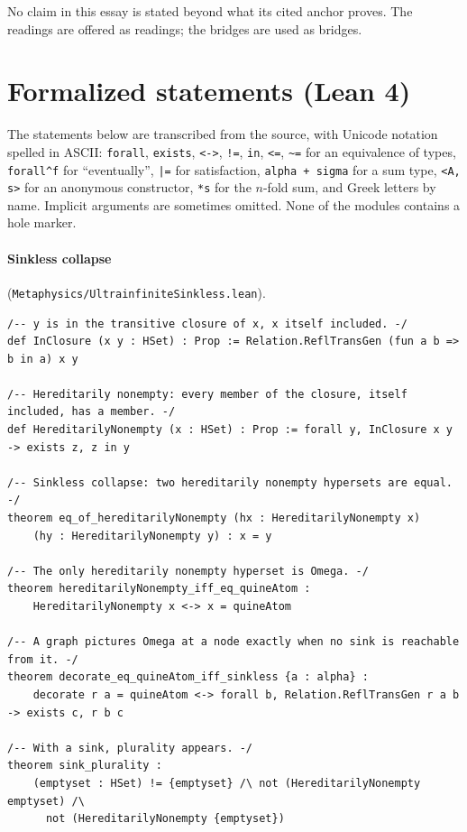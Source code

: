 \documentclass[]{article}
\theoremstyle{definition}
\theoremstyle{remark}
\newcommand{\lpath}[1]{{\ttfamily\nolinkurl{#1}}}
\newcommand{\meta}[1]{\lpath{Metaphysics/#1.lean}}
\begin{document}
No claim in this essay is stated beyond what its cited anchor proves. The readings are offered as
readings; the bridges are used as bridges.

\appendix

\section{Formalized statements (Lean 4)}
\label{app:lean}

The statements below are transcribed from the source, with Unicode notation spelled in ASCII:
\texttt{forall}, \texttt{exists}, \texttt{<->}, \texttt{!=}, \texttt{in}, \texttt{<=},
\texttt{\textasciitilde=} for an equivalence of types, \texttt{forall\textasciicircum f} for
``eventually'', \texttt{|=} for satisfaction, \texttt{alpha + sigma} for a sum type,
\texttt{<A, s>} for an anonymous constructor, \texttt{*s} for the $n$-fold sum, and Greek letters by
name. Implicit arguments are sometimes omitted. None of the modules contains a hole marker.

\paragraph{Sinkless collapse} (\meta{UltrainfiniteSinkless}).
\begin{lstlisting}
/-- y is in the transitive closure of x, x itself included. -/
def InClosure (x y : HSet) : Prop := Relation.ReflTransGen (fun a b => b in a) x y

/-- Hereditarily nonempty: every member of the closure, itself included, has a member. -/
def HereditarilyNonempty (x : HSet) : Prop := forall y, InClosure x y -> exists z, z in y

/-- Sinkless collapse: two hereditarily nonempty hypersets are equal. -/
theorem eq_of_hereditarilyNonempty (hx : HereditarilyNonempty x)
    (hy : HereditarilyNonempty y) : x = y

/-- The only hereditarily nonempty hyperset is Omega. -/
theorem hereditarilyNonempty_iff_eq_quineAtom :
    HereditarilyNonempty x <-> x = quineAtom

/-- A graph pictures Omega at a node exactly when no sink is reachable from it. -/
theorem decorate_eq_quineAtom_iff_sinkless {a : alpha} :
    decorate r a = quineAtom <-> forall b, Relation.ReflTransGen r a b -> exists c, r b c

/-- With a sink, plurality appears. -/
theorem sink_plurality :
    (emptyset : HSet) != {emptyset} /\ not (HereditarilyNonempty emptyset) /\
      not (HereditarilyNonempty {emptyset})
\end{lstlisting}
\end{document}
